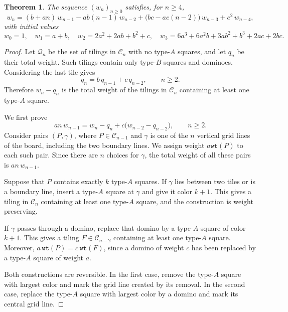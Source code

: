 \documentclass[11pt]{amsart}
\newcommand{\wt}{{\texttt{wt}}}
\theoremstyle{plain}
\numberwithin{equation}{section}
\newtheorem{theorem}[thm]{Theorem}
\begin{document}
\begin{theorem}\label{thm:wn-recurrence}
The sequence $(w_n)_{n\ge0}$ satisfies, for $n\ge 4$,
\begin{equation}\label{eq:wn-rec}
w_n=(b+an)\,w_{n-1}-ab(n-1)\,w_{n-2}+\bigl(bc-ac(n-2)\bigr)\,w_{n-3}+c^2\,w_{n-4},
\end{equation}
with initial values
\[
w_0=1,\quad 
w_1=a+b,\quad
w_2=2a^2+2ab+b^2+c,\quad
w_3=6a^3+6a^2b+3ab^2+b^3+2ac+2bc.
\]
\end{theorem}
\begin{proof}
Let $\mathcal{Q}_n$ be the set of tilings in $\mathcal{C}_n$ with no type-$A$ squares, and let $q_n$ be their total weight. Such
tilings contain only type-$B$ squares and dominoes. Considering
the last tile gives
\begin{equation}\label{eq:gn-recurrence}
q_n=b\,q_{n-1}+c\,q_{n-2},
\qquad n\geq 2.
\end{equation}
Therefore $w_n-q_n$ is the total weight of the tilings in $\mathcal{C}_n$
containing at least one type-$A$ square. 

We first prove
\begin{equation}\label{eq:wn-positive-recurrence}
an\,w_{n-1}
=
w_n-q_n+c\bigl(w_{n-2}-q_{n-2}\bigr),
\qquad n\geq 2.
\end{equation}
Consider pairs $(P,\gamma)$, where $P\in\mathcal{C}_{n-1}$ and
$\gamma$ is one of the $n$ vertical grid lines of the board, including the two boundary lines. We assign weight $a\wt(P)$ to each such pair. Since there are $n$ choices for $\gamma$, the total weight of all
these pairs is $an\,w_{n-1}$.


Suppose that $P$ contains exactly $k$ type-$A$ squares. If $\gamma$ lies between two tiles or is a boundary line, insert a type-$A$ square
at $\gamma$ and give it color $k+1$.   This gives a tiling in $\mathcal{C}_n$ containing at least one type-$A$ square, and the
construction is weight preserving.

If $\gamma$ passes through a domino, replace that domino by a type-$A$
square of color $k+1$. This gives a tiling $F\in\mathcal{C}_{n-2}$
containing at least one type-$A$ square. Moreover, $a\,\wt(P)=c\,\wt(F)$, since a domino of weight $c$ has been replaced by a type-$A$ square
of weight $a$. 

Both constructions are reversible. In the first case, remove the
type-$A$ square with largest color and mark the grid line created by
its removal. In the second case, replace the type-$A$ square with
largest color by a domino and mark its central grid line.



\end{proof}
\end{document}
